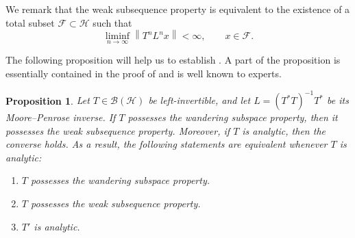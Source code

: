 \documentclass[11pt, reqno, a4paper]{amsart}
\newtheorem{proposition}[theorem]{Proposition}
\theoremstyle{definition}
\newcommand{\calF}{{\mathcal{F}}}
\newcommand{\calH}{{\mathcal{H}}}
\newcommand{\norm}[1]{\left\lVert #1 \right\rVert}
\numberwithin{equation}{section}
\begin{document}
We remark that the weak subsequence property is equivalent to the existence of a total subset $\calF \subset \calH$ such that
\begin{equation*}
    \liminf_{n \to \infty} \norm{T^n L^n x} < \infty, \qquad x \in \calF.
\end{equation*}

The following proposition will help us to establish . A part of the proposition is essentially contained in the proof of \cite[Theorem 1]{MR936999} and is well known to experts.

    \begin{proposition}
    \label{prop:equivalences-of-WSP}
    Let $T\in\mathcal B(\mathcal H)$ be left-invertible, and let $L=(T^*T)^{-1}T^*$ be its Moore--Penrose inverse. If $T$ possesses the wandering subspace property, then it possesses the weak subsequence property. Moreover, if $T$ is analytic, then the converse holds. As a result, the following statements are equivalent whenever $T$ is analytic:
    \begin{enumerate}
        \item[\rm (i)] $T$ possesses the wandering subspace property.
        \item[\rm (ii)] $T$ possesses the weak subsequence property.
        \item[\rm (iii)] $T'$ is analytic.
    \end{enumerate}
    \end{proposition}
    
\end{document}
